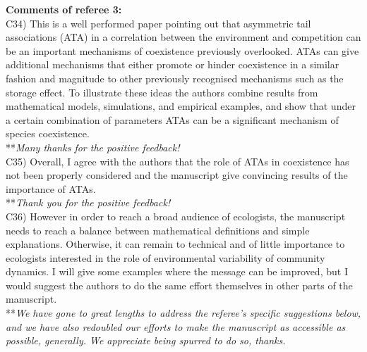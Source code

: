 \documentclass[letterpaper,11pt]{article}
\begin{document}
\noindent \textbf{Comments of referee 3:} \\
  
\noindent C34) This is a well performed paper pointing out that asymmetric tail associations (ATA) in a correlation between the environment and competition can be an important mechanisms of coexistence previously overlooked. ATAs can give additional mechanisms that either promote or hinder coexistence in a similar fashion and magnitude to other previously recognised mechanisms such as the storage effect. To illustrate these ideas the authors combine results from mathematical models, simulations, and empirical examples, and show that under a certain combination of parameters ATAs can be a significant mechanism of species coexistence. \\

\noindent ***\emph{Many thanks for the positive feedback!} \\

\noindent C35) Overall, I agree with the authors that the role of ATAs in coexistence has not been properly considered and the manuscript give convincing results of the importance of ATAs. \\

\noindent ***\emph{Thank you for the positive feedback!} \\

\noindent C36) However in order to reach a broad audience of ecologists, the manuscript needs to reach a balance between mathematical definitions and simple explanations. Otherwise, it can remain to technical and of little importance to ecologists interested in the role of environmental variability of community dynamics. I will give some examples where the message can be improved, but I would suggest the authors to do the same effort themselves in other parts of the manuscript. \\

\noindent ***\emph{We have gone to great lengths to address the referee's specific suggestions below, and we have also redoubled our
efforts to make the manuscript as accessible as possible, generally. We appreciate being spurred to do so, thanks. } \\
\end{document}
